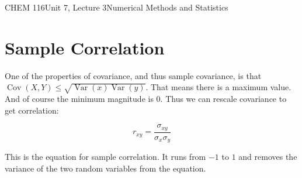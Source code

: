 \documentclass{article}
\DeclareMathOperator{\Var}{Var}
\DeclareMathOperator{\Cov}{Cov}
\begin{document}
\begin{tdoc}{CHEM 116}{Unit 7, Lecture 3}{Numerical Methods and Statistics}
\section{Sample Correlation}

One of the properties of covariance, and thus sample covariance, is
that $\Cov(X,Y) \leq \sqrt{\Var(x)\Var(y)}$. That means there is a
maximum value. And of course the minimum magnitude is $0$. Thus we can
rescale covariance to get correlation:

\begin{equation}
  r_{xy} = \frac{\sigma_{xy}}{\sigma_x \sigma_y}
\end{equation}

This is the equation for sample correlation.  It runs from $-1$ to $1$
and removes the variance of the two random variables from the
equation.



\end{tdoc}
\end{document}
